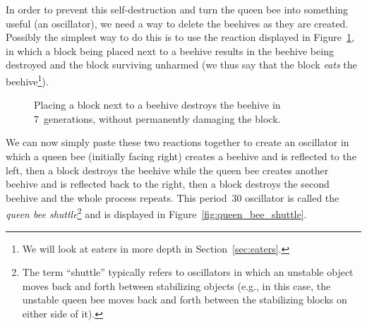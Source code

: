 In order to prevent this self-destruction and turn the queen bee into something useful (an oscillator), we need a way to delete the beehives as they are created. Possibly the simplest way to do this is to use the reaction displayed in Figure~\ref{fig:beehive_block}, in which a block being placed next to a beehive results in the beehive being destroyed and the block surviving unharmed (we thus say that the block \emph{eats} the beehive\footnote{We will look at eaters in more depth in Section~\ref{sec:eaters}.}).

\begin{figure}[!htb]
	\centering
	\caption{Placing a block next to a beehive destroys the beehive in 7~generations, without permanently damaging the block.}\label{fig:beehive_block}
\end{figure}

We can now simply paste these two reactions together to create an oscillator in which a queen bee (initially facing right) creates a beehive and is reflected to the left, then a block destroys the beehive while the queen bee creates another beehive and is reflected back to the right, then a block destroys the second beehive and the whole process repeats. This period~30 oscillator is called the \emph{queen bee shuttle}\footnote{The term ``shuttle'' typically refers to oscillators in which an unstable object moves back and forth between stabilizing objects (e.g., in this case, the unstable queen bee moves back and forth between the stabilizing blocks on either side of it).} and is displayed in Figure~\ref{fig:queen_bee_shuttle}.

